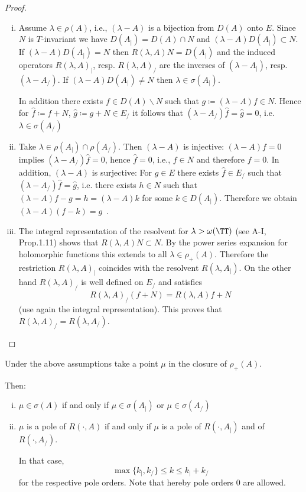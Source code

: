 \begin{proof}
\begin{enumerate}[(i), wide]
\item 
Assume $\lambda \in \rho(A)$, i.e., $(\lambda-A)$ is a bijection from $D(A)$ onto $E$.
Since $N$ is $T$-invariant we have $D(A_{|}) = D(A) \cap N$ and $(\lambda-A)D(A_{|}) \subset N$.
If $(\lambda-A)D(A_{|}) = N$ then $R(\lambda,A)N = D(A_{|})$ and the induced operators $R(\lambda,A)_{|}$, resp. $R(\lambda,A)_{/}$ are the inverses of $(\lambda-A_{|})$, resp. $(\lambda-A_{/})$.
If $(\lambda-A)D(A_{|}) \neq N$ then $\lambda \in \sigma(A_{|})$.

In addition there exists $f \in D(A)\backslash N$ such that $g \coloneqq (\lambda-A)f \in N$.
Hence for $\hat{f} \coloneqq f+N$, $\hat{g} \coloneqq g+N \in E_{/}$ it follows that $(\lambda-A_{/})\hat{f} = \hat{g} = 0$, i.e. $\lambda \in \sigma(A_{/})$

\item 
Take $\lambda \in \rho(A_{|}) \cap \rho(A_{/})$.
Then $(\lambda-A)$ is injective: $(\lambda-A)f = 0$ implies $(\lambda-A_{/})\hat{f}= 0$, hence $\hat{f} = 0$, i.e., $f \in N$ and therefore $f = 0$.
In addition, $(\lambda-A)$ is surjective: For $g \in E$ there exists $\hat{f} \in E_{/}$ such that $(\lambda-A_{/})\hat{f} = \hat{g}$, i.e. there exists $h \in N$ such that $(\lambda-A)f - g = h = (\lambda-A)k$ for some $k \in D(A_{|})$.
Therefore we obtain $(\lambda-A)(f-k) = g$~.

\item 
The integral representation of the resolvent for $\lambda > \omega(\TT)$ (see A-I, Prop.1.11) shows that $R(\lambda,A)N \subset N$.
By the power series expansion for holomorphic functions this extends to all $\lambda \in \rho_{+}(A)$.
Therefore the restriction $R(\lambda,A)_{|}$ coincides with the resolvent $R(\lambda,A_{|})$.
On the other hand $R(\lambda,A)_{/}$ is well defined on $E_{/}$ and satisfies
\[
R(\lambda,A)_{/}(f+N) = R(\lambda,A)f + N
\]
(use again the integral representation).
This proves that $R(\lambda,A)_{/} = R(\lambda,A_{/})$.
\end{enumerate}
\end{proof}
\begin{corollary}\label{cor:a3-4.3}

Under the above assumptions take a point $\mu$ in the closure of $\rho_{+}(A)$.

Then:
\begin{enumerate}[(i)]
\item 
$\mu \in \sigma(A)$ if and only if $\mu \in \sigma(A_{|})$ or $\mu \in \sigma(A_{/})$

\item 
$\mu$ is a pole of $R(\cdot,A)$ if and only if $\mu$ is a pole of $R(\cdot,A_{|})$ and of $R(\cdot,A_{/})$.

In that case,
\[
\max\{k_{|},k_{/}\} \leq k \leq k_{|} + k_{/}
\]
for the respective pole orders. Note that hereby pole orders $0$ are allowed.
\end{enumerate}
\end{corollary}

